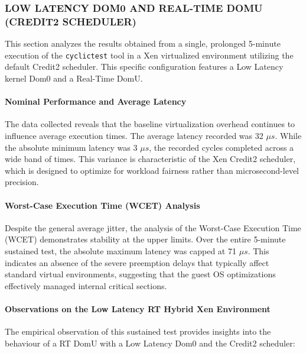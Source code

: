\subsubsection{LOW LATENCY DOM0 AND REAL-TIME DOMU (CREDIT2
SCHEDULER)}\label{low-latency-dom0-and-real-time-domu-credit2-scheduler}

This section analyzes the results obtained from a single, prolonged
5-minute execution of the \texttt{cyclictest} tool in a Xen virtualized
environment utilizing the default Credit2 scheduler. This specific
configuration features a Low Latency kernel Dom0 and a Real-Time DomU.

\paragraph{Nominal Performance and Average
Latency}\label{nominal-performance-and-average-latency-10}

The data collected reveals that the baseline virtualization overhead
continues to influence average execution times. The average latency
recorded was 32 $\mu s$. While the absolute minimum latency was 3 $\mu s$, the
recorded cycles completed across a wide band of times. This variance is
characteristic of the Xen Credit2 scheduler, which is designed to
optimize for workload fairness rather than microsecond-level precision.

\paragraph{Worst-Case Execution Time (WCET)
Analysis}\label{worst-case-execution-time-wcet-analysis-12}

Despite the general average jitter, the analysis of the Worst-Case
Execution Time (WCET) demonstrates stability at the upper limits. Over
the entire 5-minute sustained test, the absolute maximum latency was
capped at 71 $\mu s$. This indicates an absence of the severe preemption
delays that typically affect standard virtual environments, suggesting
that the guest OS optimizations effectively managed internal critical
sections.

\paragraph{Observations on the Low Latency RT Hybrid Xen
Environment}\label{observations-on-the-low-latency-rt-hybrid-xen-environment}

The empirical observation of this sustained test provides insights into
the behaviour of a RT DomU with a Low Latency Dom0 and the Credit2
scheduler:

